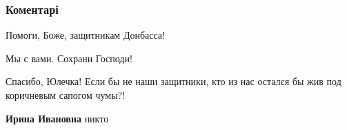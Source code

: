  
 
 
 
 
\subsubsection{Коментарі}
\label{sec:25_11_2021.fb.andrienko_julia.doneck.1.nasha_pomosch_front.cmt}

\begin{itemize} %
Помоги, Боже, защитникам Донбасса!

Мы с вами. Сохрани Господи!

Спасибо, Юлечка! Если бы не наши защитники, кто из нас остался бы жив под коричневым сапогом чумы?!

\textbf{Ирина Ивановна} никто
\end{itemize} %
